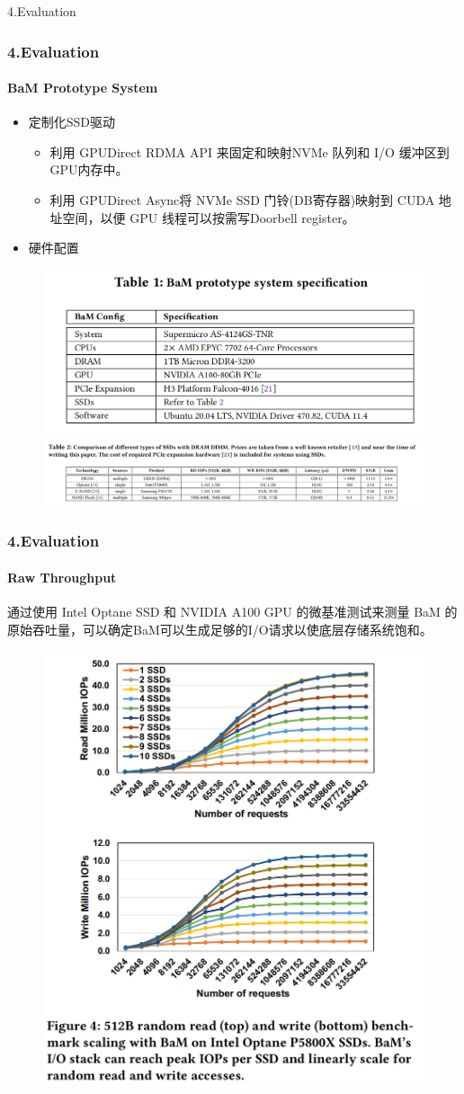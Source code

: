 \documentclass[10pt]{ctexbeamer}
\begin{document}
\begin{frame}
  \begin{center}
    \Huge 4.Evaluation
  \end{center}
\end{frame}
\begin{frame}
  \frametitle{4.Evaluation}
  \framesubtitle{BaM Prototype System}
  \begin{itemize}
    \item 定制化SSD驱动
    \begin{itemize}
      \item 利用 GPUDirect RDMA API 来固定和映射NVMe 队列和 I/O 缓冲区到GPU内存中。
      \item 利用 GPUDirect Async将 NVMe SSD 门铃(DB寄存器)映射到 CUDA 地址空间，以便 GPU 线程可以按需写Doorbell register。
    \end{itemize}
    \item 硬件配置
  \end{itemize}
  \begin{figure}
    \centering
    \includegraphics[width=.5\textwidth, height=.5\textheight, keepaspectratio]{images/systab.png}
    \includegraphics[width=.8\textwidth, height=.4\textheight, keepaspectratio]{images/SSD.png}
  \end{figure}
\end{frame}

\begin{frame}
  \frametitle{4.Evaluation}
  \framesubtitle{Raw Throughput}
  通过使用 Intel Optane SSD 和 NVIDIA A100 GPU 的微基准测试来测量 BaM 的原始吞吐量，可以确定BaM可以生成足够的I/O请求以使底层存储系统饱和。
  
  \begin{figure}
    \centering
    \includegraphics[width=.5\textwidth, height=.8\textheight, keepaspectratio]{images/iops.png}
  \end{figure}
\end{frame}
\end{document}

